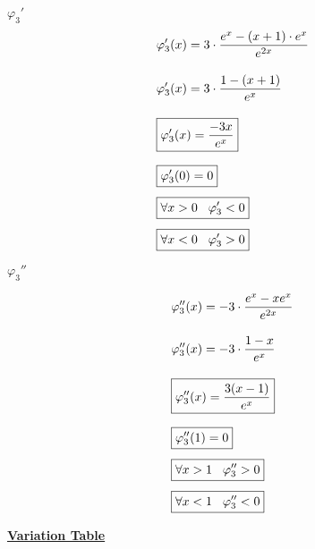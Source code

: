 \textbf{\underline{\(\varphi_3'\)}}
\begin{align*}
    &\varphi_3'(x) = 3\cdot \dfrac{e^{x} - (x+1)\cdot e^{x}}{e^{2x}}\\[0.35cm]
    &\varphi_3'(x) = 3\cdot \dfrac{1 - (x+1)}{e^{x}}\\[0.35cm]
    &\boxed{\varphi_3'(x) = \dfrac{-3x}{e^{x}}}\\[0.25cm]
    &\boxed{\varphi_3'(0) = 0 }\\[0.15cm]
    &\boxed{\forall x > 0 \hspace{0.3cm} \varphi_3' < 0}\\[0.15cm]
    &\boxed{\forall x < 0 \hspace{0.3cm} \varphi_3' > 0}
\end{align*}

\vspace{0.5cm}
\textbf{\underline{\(\varphi_3''\)}}
\begin{center}
    \begin{align*}
   &\varphi_3''(x) = -3 \cdot \dfrac{e^{x} - xe^{x}}{e^{2x}}\\[0.35cm]
   &\varphi_3''(x) = -3 \cdot \dfrac{1 - x}{e^{x}}\\[0.35cm]
   &\boxed{\varphi_3''(x) =  \dfrac{3(x-1)}{e^{x}}}\\[0.25cm]
   &\boxed{\varphi_3''(1) =  0}\\[0.15cm]
   &\boxed{\forall x > 1 \hspace{0.3cm} \varphi_3'' > 0}\\[0.15cm]
   &\boxed{\forall x < 1 \hspace{0.3cm} \varphi_3'' < 0}
    \end{align*}
\end{center}

\newpage
\textbf{\underline{Variation Table}}

\begin{center}
\end{center}
\vspace{0.25cm}

\vspace{0.25cm}

